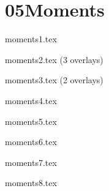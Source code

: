 \documentclass[9pt,xcolor={svgnames, x11names}]{beamer}
\def\scale{1} %
\begin{document}


\section{05Moments}

\begin{frame}{moments1.tex}
	\def\scale{1}
	\centering
	
\end{frame}

\begin{frame}{moments2.tex (3 overlays)}
	\def\scale{1}
	\centering
	
\end{frame}
%
\begin{frame}{moments3.tex (2 overlays)}
	\def\scale{0.8}
	\centering
	
\end{frame}
\begin{frame}{moments4.tex }
	\def\scale{0.8}
	\centering
	
\end{frame}
\begin{frame}{moments5.tex }
	\def\scale{1}
	\centering
	
\end{frame}
\begin{frame}{moments6.tex }
	\def\scale{1}
	\centering
	
\end{frame}
\begin{frame}{moments7.tex }
	\def\scale{0.6}
	\centering
	
\end{frame}
\begin{frame}{moments8.tex }
	\def\scale{0.8}
	\centering
	
\end{frame}
\end{document}
